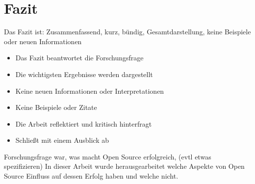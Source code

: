 \chapter{Fazit}

\begin{note}
    Das Fazit ist: Zusammenfassend, kurz, bündig, Gesamtdarstellung, keine Beispiele oder neuen Informationen

    \begin{itemize}
        \setlength\itemsep{0em}
        \item Das Fazit beantwortet die Forschungsfrage
        \item Die wichtigsten Ergebnisse werden dargestellt
        \item Keine neuen Informationen oder Interpretationen
        \item Keine Beispiele oder Zitate
        \item Die Arbeit reflektiert und kritisch hinterfragt
        \item Schließt mit einem Ausblick ab
    \end{itemize}
\end{note}

Forschungsfrage war, was macht Open Source erfolgreich, (evtl etwas spezifizieren)
In dieser Arbeit wurde herausgearbeitet welche Aspekte von Open Source Einfluss auf dessen
Erfolg haben und welche nicht.




